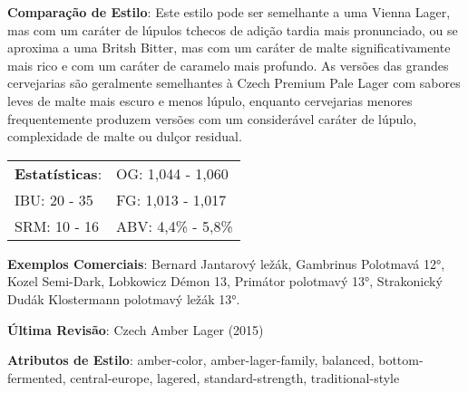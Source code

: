 \textbf{Comparação de Estilo}: Este estilo pode ser semelhante a uma Vienna Lager, mas com um caráter de lúpulos tchecos de adição tardia mais pronunciado, ou se aproxima a uma Britsh Bitter, mas com um caráter de malte significativamente mais rico e com um caráter de caramelo mais profundo. As versões das grandes cervejarias são geralmente semelhantes à Czech Premium Pale Lager com sabores leves de malte mais escuro e menos lúpulo, enquanto cervejarias menores frequentemente produzem versões com um considerável caráter de lúpulo, complexidade de malte ou dulçor residual.

\begin{tabular}{@{}p{35mm}p{35mm}@{}}
  \textbf{Estatísticas}: & OG: 1,044 - 1,060 \\
  IBU: 20 - 35  & FG: 1,013 - 1,017  \\
  SRM: 10 - 16   & ABV: 4,4\% - 5,8\%
\end{tabular}

\textbf{Exemplos Comerciais}: Bernard Jantarový ležák, Gambrinus Polotmavá 12°, Kozel Semi-Dark, Lobkowicz Démon 13, Primátor polotmavý 13°, Strakonický Dudák Klostermann polotmavý ležák 13°.

\textbf{Última Revisão}: Czech Amber Lager (2015)

\textbf{Atributos de Estilo}: amber-color, amber-lager-family, balanced, bottom-fermented, central-europe, lagered, standard-strength, traditional-style